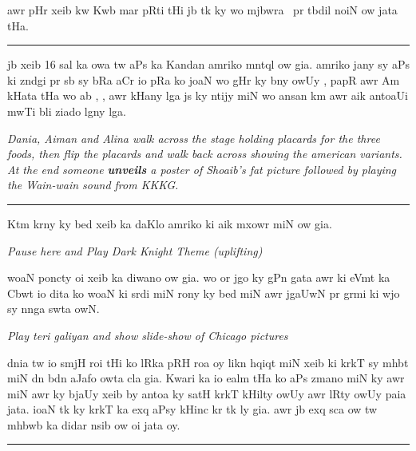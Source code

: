 \documentclass{article}
\begin{document}
	awr pHr xeib kw Kwb mar pRti tHi jb tk ky wo mjbwra~  pr tbdil noiN ow jata tHa.


\rule{\textwidth}{1pt}

	jb xeib 16 sal ka owa tw aPs ka Kandan amriko mntql ow gia.
	amriko jany sy aPs ki zndgi pr sb sy bRa aCr io pRa ko joaN wo gHr ky bny owUy , papR awr Am kHata tHa wo ab , , awr  kHany lga js ky ntijy miN wo ansan km awr aik antoaUi mwTi bli ziado lgny lga.

\begin{enpara}
	\itshape
	Dania, Aiman and Alina walk across the stage holding placards for the three foods, then flip the placards and walk back across showing the american variants. At the end someone \textbf{unveils} a poster of Shoaib's fat picture followed by playing the Wain-wain sound from KKKG.
\end{enpara}

\rule{\textwidth}{1pt}

	 Ktm krny ky bed xeib ka daKlo amriko ki aik mxowr  miN ow gia.
\begin{enpara}
	\itshape
	Pause here and Play Dark Knight Theme (uplifting)
\end{enpara}

	\vspace{0.5\baselineskip}
	woaN poncty oi xeib  ka diwano ow gia.
	wo or jgo  ky gPn gata awr  ki eVmt ka Cbwt io dita ko woaN ki srdi miN rony ky bed miN awr jgaUwN pr grmi ki wjo sy nnga swta owN. \hfill {}

\begin{enpara}
	\itshape
	Play teri galiyan and show slide-show of Chicago pictures
\end{enpara}

	\vspace{0.5\baselineskip}
	dnia tw io smjH roi tHi ko lRka  pRH roa oy likn hqiqt miN xeib ki krkT sy mhbt miN dn bdn aJafo owta cla gia.
	Kwari ka io ealm tHa ko aPs zmano miN  ky  awr  miN  awr  ky bjaUy xeib by antoa  ky satH krkT kHilty owUy awr lRty owUy paia jata.
	ioaN tk ky krkT ka exq aPsy kHinc kr  tk ly gia.
	awr jb exq sca ow tw mhbwb ka didar nsib ow oi jata oy. \hfill {}

\rule{\textwidth}{1pt}
\end{document}
